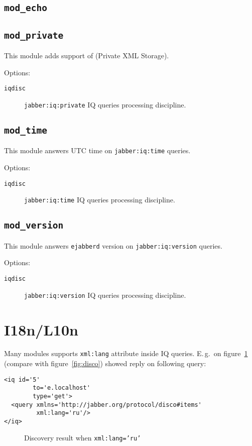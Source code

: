 \documentclass[10pt]{article}
\newcommand{\imgscale}{0.58}
\newcommand{\insimg}[1]{\insscaleimg{\imgscale}{#1}}
\newcommand{\insscaleimg}[2]{
  \imgsrc{#2}{}
  \begin{latexonly}
    \scalebox{#1}{\texttt{[image: \#2]}}
  \end{latexonly}
}
\newcommand{\ns}[1]{\texttt{#1}}
\newcommand{\ejabberd}{\texttt{ejabberd}}
\newcommand{\modecho}{\texttt{mod\_echo}}
\newcommand{\modprivate}{\texttt{mod\_private}}
\newcommand{\modtime}{\texttt{mod\_time}}
\newcommand{\modversion}{\texttt{mod\_version}}
\begin{document}
\subsection{\modecho{}}
\label{sec:modecho}



\subsection{\modprivate{}}
\label{sec:modprivate}

This module adds support of
 (Private XML
Storage).

Options:
\begin{description}
\item[\texttt{iqdisc}] \ns{jabber:iq:private} IQ queries processing discipline.
\end{description}

\subsection{\modtime{}}
\label{sec:modtime}

This module answers UTC time on \ns{jabber:iq:time} queries.

Options:
\begin{description}
\item[\texttt{iqdisc}] \ns{jabber:iq:time} IQ queries processing discipline.
\end{description}


\subsection{\modversion{}}
\label{sec:modversion}

This module answers \ejabberd{} version on \ns{jabber:iq:version} queries.

Options:
\begin{description}
\item[\texttt{iqdisc}] \ns{jabber:iq:version} IQ queries processing discipline.
\end{description}




\section{I18n/L10n}
\label{sec:i18nl10n}

Many modules supports \texttt{xml:lang} attribute inside IQ queries.  E.\,g.\ 
on figure~\ref{fig:discorus} (compare with figure~\ref{fig:disco}) showed reply
on following query:
\begin{verbatim}
<iq id='5'
        to='e.localhost'
        type='get'>
  <query xmlns='http://jabber.org/protocol/disco#items'
         xml:lang='ru'/>
</iq>
\end{verbatim}

\begin{figure}[htbp]
  \centering
  \insimg{discorus.png}
  \caption{Discovery result when \texttt{xml:lang='ru'}}
  \label{fig:discorus}
\end{figure}
\end{document}
